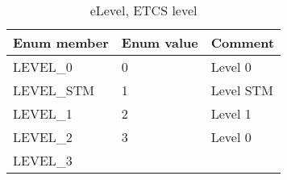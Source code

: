 \documentclass{template/openetcs_article}
\begin{document}
\newpage
\begin{longtable}{|l|l|l|}
	\caption{eLevel, ETCS level} \\ 
	\hline
		\begin{minipage}[t]{0.45\linewidth} \textbf{Enum member}	\end{minipage}
	&	\begin{minipage}[t]{0.10\linewidth} \textbf{Enum value}	\end{minipage} 
	&	\begin{minipage}[t]{0.50\linewidth} \textbf{Comment} \end{minipage} \\
	\hline
		\begin{minipage}[t]{0.45\linewidth} LEVEL\_0 \end{minipage} 
	&	\begin{minipage}[t]{0.10\linewidth} 0 \end{minipage} 
	&	\begin{minipage}[t]{0.50\linewidth} Level 0 \end{minipage}\\
	\hline
		\begin{minipage}[t]{0.45\linewidth} LEVEL\_STM \end{minipage} 
	&	\begin{minipage}[t]{0.10\linewidth} 1 \end{minipage} 
	&	\begin{minipage}[t]{0.50\linewidth} Level STM \end{minipage}\\
	\hline
		\begin{minipage}[t]{0.45\linewidth} LEVEL\_1 \end{minipage} 
	&	\begin{minipage}[t]{0.10\linewidth} 2 \end{minipage} 
	&	\begin{minipage}[t]{0.50\linewidth} Level 1 \end{minipage}\\
	\hline
		\begin{minipage}[t]{0.45\linewidth} LEVEL\_2 \end{minipage} 
	&	\begin{minipage}[t]{0.10\linewidth} 3 \end{minipage} 
	&	\begin{minipage}[t]{0.50\linewidth} Level 0 \end{minipage}\\
	\hline
		\begin{minipage}[t]{0.45\linewidth} LEVEL\_3 \end{minipage} 

\end{longtable}
\end{document}
